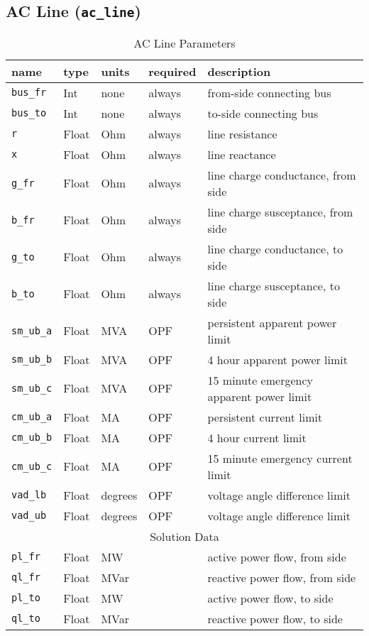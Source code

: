 \documentclass{article}
\begin{document}
\subsection{AC Line (\texttt{ac\_line})}

\begin{table}[h]
\centering
\caption{AC Line Parameters}
\begin{tabular}{|l|l|l|l|p{7cm}|}
\hline
name & type & units & required & description \\ 
\hline
\hline
\texttt{bus\_fr} & Int & none & always & from-side connecting bus \\ 
\hline
\texttt{bus\_to} & Int & none & always & to-side connecting bus \\ 
\hline
\texttt{r} & Float & Ohm & always & line resistance \\ 
\hline
\texttt{x} & Float & Ohm & always & line reactance \\ 
\hline
\texttt{g\_fr} & Float & Ohm & always & line charge conductance, from side \\ 
\hline
\texttt{b\_fr} & Float & Ohm & always & line charge susceptance, from side \\ 
\hline
\texttt{g\_to} & Float & Ohm & always & line charge conductance, to side \\ 
\hline
\texttt{b\_to} & Float & Ohm & always & line charge susceptance, to side \\ 
\hline
\texttt{sm\_ub\_a} & Float & MVA & OPF & persistent apparent power limit \\ 
\hline
\texttt{sm\_ub\_b} & Float & MVA & OPF & 4 hour apparent power limit \\ 
\hline
\texttt{sm\_ub\_c} & Float & MVA & OPF & 15 minute emergency apparent power limit \\ 
\hline
\texttt{cm\_ub\_a} & Float & MA & OPF & persistent current limit \\ 
\hline
\texttt{cm\_ub\_b} & Float & MA & OPF & 4 hour current limit \\ 
\hline
\texttt{cm\_ub\_c} & Float & MA & OPF & 15 minute emergency current limit \\ 
\hline
\texttt{vad\_lb} & Float & degrees & OPF & voltage angle difference limit \\ 
\hline
\texttt{vad\_ub} & Float & degrees & OPF & voltage angle difference limit \\ 
\hline
%
\hline
\multicolumn{5}{|c|}{Solution Data} \\
\hline
\texttt{pl\_fr} & Float & MW &  & active power flow, from side \\ 
\hline
\texttt{ql\_fr} & Float & MVar &  & reactive power flow, from side \\ 
\hline
\texttt{pl\_to} & Float & MW &  & active power flow, to side \\ 
\hline
\texttt{ql\_to} & Float & MVar &  & reactive power flow, to side \\ 
\hline
\end{tabular}
\label{tbl:tbd}
\end{table}
\end{document}
